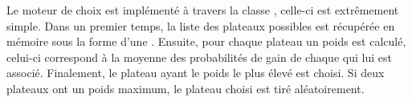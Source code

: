 Le moteur de choix est implémenté à travers la classe , celle-ci est extrêmement simple. Dans un premier temps, la liste des plateaux possibles est récupérée en mémoire sous la forme d'une . Ensuite, pour chaque plateau un poids est calculé, celui-ci correspond à la moyenne des probabilités de gain de chaque  qui lui est associé. Finalement, le plateau ayant le poids le plus élevé est choisi. Si deux plateaux ont un poids maximum, le plateau choisi est tiré aléatoirement.

